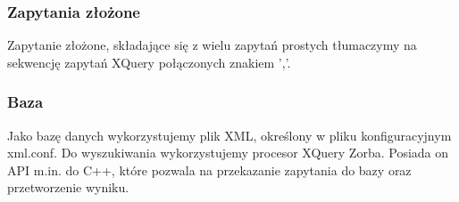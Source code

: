\subsubsection{Zapytania złożone}
Zapytanie złożone, składające się z wielu zapytań prostych tłumaczymy na sekwencję zapytań XQuery połączonych znakiem ','.

\subsubsection{Baza}
Jako bazę danych wykorzystujemy plik XML, określony w pliku konfiguracyjnym xml.conf. Do wyszukiwania wykorzystujemy procesor XQuery Zorba. Posiada on API m.in. do C++, które pozwala na przekazanie zapytania do bazy oraz przetworzenie wyniku.
